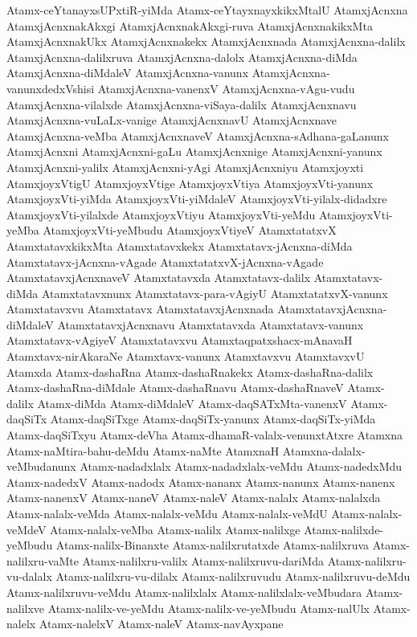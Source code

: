 {Atamx-ceYtanayxsUPxtiR-yiMda
Atamx-ceYtayxnayxkikxMtalU
AtamxjAcnxna
AtamxjAcnxnakAkxgi
AtamxjAcnxnakAkxgi-ruva
AtamxjAcnxnakikxMta
AtamxjAcnxnakUkx
AtamxjAcnxnakekx
AtamxjAcnxnada
AtamxjAcnxna-dalilx
AtamxjAcnxna-dalilxruva
AtamxjAcnxna-dalolx
AtamxjAcnxna-diMda
AtamxjAcnxna-diMdaleV
AtamxjAcnxna-vanunx
AtamxjAcnxna-vanunxdedxVshisi
AtamxjAcnxna-vanenxV
AtamxjAcnxna-vAgu-vudu
AtamxjAcnxna-vilalxde
AtamxjAcnxna-viSaya-dalilx
AtamxjAcnxnavu
AtamxjAcnxna-vuLaLx-vanige
AtamxjAcnxnavU
AtamxjAcnxnave
AtamxjAcnxna-veMba
AtamxjAcnxnaveV
AtamxjAcnxna-sAdhana-gaLanunx
AtamxjAcnxni
AtamxjAcnxni-gaLu
AtamxjAcnxnige
AtamxjAcnxni-yanunx
AtamxjAcnxni-yalilx
AtamxjAcnxni-yAgi
AtamxjAcnxniyu
Atamxjoyxti
AtamxjoyxVtigU
AtamxjoyxVtige
AtamxjoyxVtiya
AtamxjoyxVti-yanunx
AtamxjoyxVti-yiMda
AtamxjoyxVti-yiMdaleV
AtamxjoyxVti-yilalx-didadxre
AtamxjoyxVti-yilalxde
AtamxjoyxVtiyu
AtamxjoyxVti-yeMdu
AtamxjoyxVti-yeMba
AtamxjoyxVti-yeMbudu
AtamxjoyxVtiyeV
AtamxtatatxvX
AtamxtatavxkikxMta
Atamxtatavxkekx
Atamxtatavx-jAcnxna-diMda
Atamxtatavx-jAcnxna-vAgade
AtamxtatatxvX-jAcnxna-vAgade
AtamxtatavxjAcnxnaveV
Atamxtatavxda
Atamxtatavx-dalilx
Atamxtatavx-diMda
Atamxtatavxnunx
Atamxtatavx-para-vAgiyU
AtamxtatatxvX-vanunx
Atamxtatavxvu
Atamxtatavx
AtamxtatavxjAcnxnada
AtamxtatavxjAcnxna-diMdaleV
AtamxtatavxjAcnxnavu
Atamxtatavxda
Atamxtatavx-vanunx
Atamxtatavx-vAgiyeV
Atamxtatavxvu
Atamxtaqpatxshacx-mAnavaH
Atamxtavx-nirAkaraNe
Atamxtavx-vanunx
Atamxtavxvu
AtamxtavxvU
Atamxda
Atamx-dashaRna
Atamx-dashaRnakekx
Atamx-dashaRna-dalilx
Atamx-dashaRna-diMdale
Atamx-dashaRnavu
Atamx-dashaRnaveV
Atamx-dalilx
Atamx-diMda
Atamx-diMdaleV
Atamx-daqSATxMta-vanenxV
Atamx-daqSiTx
Atamx-daqSiTxge
Atamx-daqSiTx-yanunx
Atamx-daqSiTx-yiMda
Atamx-daqSiTxyu
Atamx-deVha
Atamx-dhamaR-valalx-venunxtAtxre
Atamxna
Atamx-naMtira-bahu-deMdu
Atamx-naMte
AtamxnaH
Atamxna-dalalx-veMbudanunx
Atamx-nadadxlalx
Atamx-nadadxlalx-veMdu
Atamx-nadedxMdu
Atamx-nadedxV
Atamx-nadodx
Atamx-nananx
Atamx-nanunx
Atamx-nanenx
Atamx-nanenxV
Atamx-naneV
Atamx-naleV
Atamx-nalalx
Atamx-nalalxda
Atamx-nalalx-veMda
Atamx-nalalx-veMdu
Atamx-nalalx-veMdU
Atamx-nalalx-veMdeV
Atamx-nalalx-veMba
Atamx-nalilx
Atamx-nalilxge
Atamx-nalilxde-yeMbudu
Atamx-nalilx-Binanxte
Atamx-nalilxrutatxde
Atamx-nalilxruva
Atamx-nalilxru-vaMte
Atamx-nalilxru-valilx
Atamx-nalilxruvu-dariMda
Atamx-nalilxru-vu-dalalx
Atamx-nalilxru-vu-dilalx
Atamx-nalilxruvudu
Atamx-nalilxruvu-deMdu
Atamx-nalilxruvu-veMdu
Atamx-nalilxlalx
Atamx-nalilxlalx-veMbudara
Atamx-nalilxve
Atamx-nalilx-ve-yeMdu
Atamx-nalilx-ve-yeMbudu
Atamx-nalUlx
Atamx-nalelx
Atamx-nalelxV
Atamx-naleV
Atamx-navAyxpane
}
